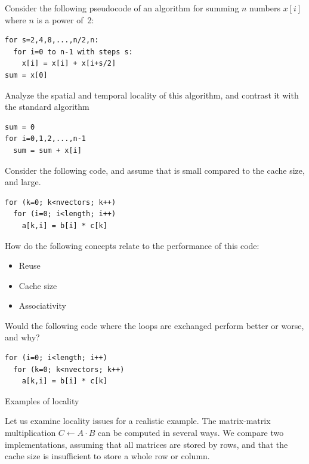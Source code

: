 \begin{exercise}
  Consider the following pseudocode of an algorithm for summing $n$
  numbers $x[i]$ where $n$ is a power of~2:
\begin{verbatim}
for s=2,4,8,...,n/2,n:
  for i=0 to n-1 with steps s:
    x[i] = x[i] + x[i+s/2]
sum = x[0]
\end{verbatim}
  Analyze the spatial and temporal locality of this algorithm, and
  contrast it with the standard algorithm
\begin{verbatim}
sum = 0
for i=0,1,2,...,n-1
  sum = sum + x[i]
\end{verbatim}
\end{exercise}

\begin{exercise}
Consider the following code, and assume that  is small
compared to the cache size, and  large.
\begin{verbatim}
for (k=0; k<nvectors; k++)
  for (i=0; i<length; i++)
    a[k,i] = b[i] * c[k]
\end{verbatim}
How do the following concepts relate to the performance of this code:
\begin{itemize}
\item Reuse
\item Cache size
\item Associativity
\end{itemize}

Would the following code where the loops are exchanged
perform better or worse, and why?
\begin{verbatim}
for (i=0; i<length; i++)
  for (k=0; k<nvectors; k++)
    a[k,i] = b[i] * c[k]
\end{verbatim}
\end{exercise}

 {Examples of locality}

Let us examine locality issues for a realistic example. The
matrix-matrix multiplication $C\leftarrow A\cdot B$ can be computed
in several ways. We compare two implementations, assuming that all
matrices are stored by rows, and that the cache size is insufficient
to store a whole row or column.

